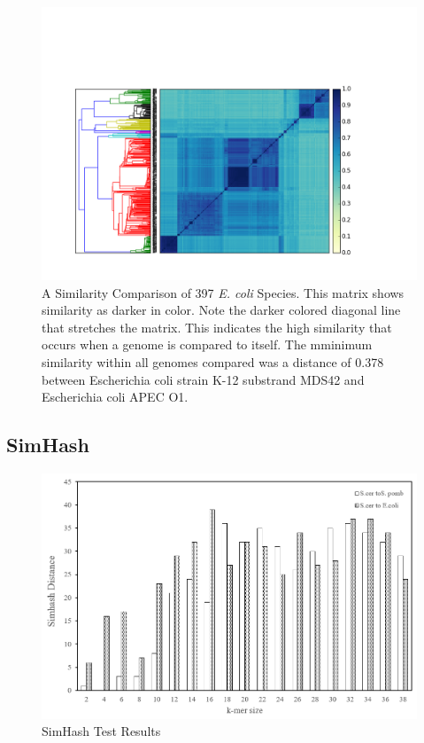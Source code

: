 \documentclass[12pt, letterpaper]{article}
\begin{document}
\FloatBarrier
\begin{figure}[h]
    \centering
    \includegraphics[width=1.0\textwidth]{All_E_coli}
    \caption{A Similarity Comparison of 397 \textit{E. coli} Species. This matrix shows similarity as darker in color. Note the darker colored diagonal line that stretches the matrix. This indicates the high similarity that occurs when a genome is compared to itself. The mminimum similarity within all genomes compared was a distance of 0.378 between Escherichia coli strain K-12 substrand MDS42 and Escherichia coli APEC O1.}
    \label{fig:All Ecoli}
\end{figure}
\FloatBarrier

\subsection{SimHash}
\FloatBarrier
\begin{figure}[h!]
	\centering
	\includegraphics[width=1.0\textwidth]{Simhash_kmer_result.png}
	\caption{SimHash Test Results}
	\label{fig:SimHashDescription}
\end{figure}
\FloatBarrier
\end{document}
